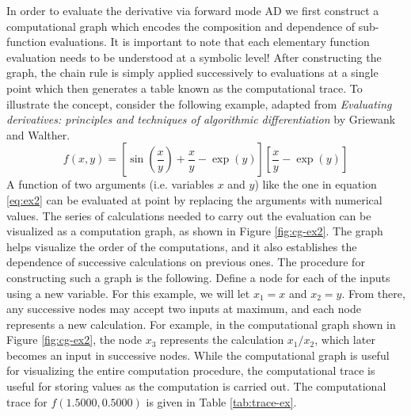 In order to evaluate the derivative via forward mode AD we first construct a computational graph which encodes the composition and dependence of sub-function evaluations. It is important to note that each elementary function evaluation needs to be understood at a symbolic level! After constructing the graph, the chain rule is simply applied successively to evaluations at a single point which then generates a table known as the computational trace. To illustrate the concept, consider the following example, adapted from \emph{Evaluating derivatives: principles and techniques of algorithmic differentiation} by Griewank and Walther. 
\begin{equation}
    f(x,y) = \left[\sin\left(\frac{x}{y}\right) + \frac{x}{y} - \exp(y)\right]
    \left[\frac{x}{y} - \exp(y)\right]
    \label{eq:ex2}
\end{equation}
A function of two arguments (i.e. variables $x$ and $y$) like the one in equation \eqref{eq:ex2} can be evaluated at point by replacing the arguments with numerical values. The series of calculations needed to carry out the evaluation can be visualized as a computation graph, as shown in Figure \ref{fig:cg-ex2}. The graph helps visualize the order of the computations, and it also establishes the dependence of successive calculations on previous ones. The procedure for constructing such a graph is the following. Define a node for each of the inputs using a new variable. For this example, we will let $x_1 = x$ and $x_2 = y$. From there, any successive nodes may accept two inputs at maximum, and each node represents a new calculation. For example, in the computational graph shown in Figure \ref{fig:cg-ex2}, the node $x_3$ represents the calculation $x_1/x_2$, which later becomes an input in successive nodes. While the computational graph is useful for visualizing the entire computation procedure, the computational trace is useful for storing values as the computation is carried out. The computational trace for $f(1.5000, 0.5000)$ is given in Table \ref{tab:trace-ex}.


